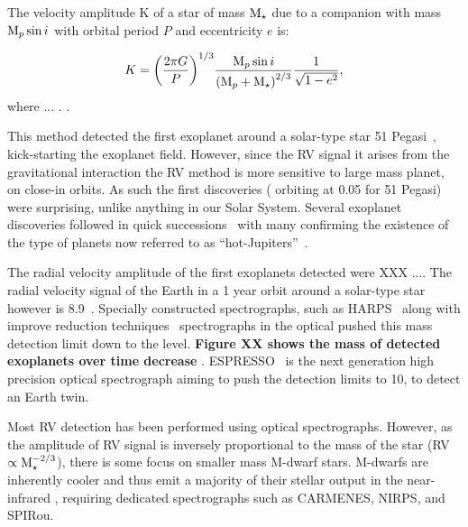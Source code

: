 The velocity amplitude K of a star of mass $\textrm{M}_{\star}$ due to a companion with mass $\textrm{M}_{p}\sin{i}$ with orbital period $P$ and eccentricity $e$ is:

\begin{equation}
K = {\left(\frac{2\pi G}{P}\right)}^{1/3} \frac{\textrm{M}_{p} \sin{i}}{{(\textrm{M}_{p} + \textrm{M}_{\star})}^{2/3}} \frac{1}{\sqrt{1-{e}^{2}}},
\end{equation}
where ... . \citet[e.g.][]{cumming_lick_1999}.


This method detected the first exoplanet around a solar-type star {51 Pegasi}~\citep{mayor_jupitermass_1995}, kick-starting the exoplanet field.
However, since the {RV} signal it arises from the gravitational interaction the {RV} method is more sensitive to large mass planet, on close-in orbits.
As such the first discoveries (\Mjup{} orbiting at 0.05\AU{} for {51 Pegasi}) were surprising, unlike anything in our Solar System.
Several exoplanet discoveries followed in quick successions~\citep[e.g.][]{butler_planet_1996, marcy_planetary_1996} with many confirming the existence of the type of planets now referred to as ``hot-Jupiters''~\citep{butler_three_1997, charbonneau_detection_2000}.

The radial velocity amplitude of the first exoplanets detected were XXX \kmps....
The radial velocity signal of the Earth in a 1 year orbit around a solar-type star however is 8.9\cmps{}~\citep{figueira_radial_2010}.
Specially constructed spectrographs, such as HARPS~\citep{mayor_setting_2003} along with improve reduction techniques~\citet{lovis_new_2007} spectrographs in the optical pushed this mass detection limit down to the \mps{} level. \textbf{ Figure XX shows the mass of detected exoplanets over time decrease} .
ESPRESSO~\citep{pepe_espresso_2014, megevand_espresso_2014} is the next generation high precision optical spectrograph aiming to push the detection limits to 10\cmps, to detect an Earth twin.

Most {RV} detection has been performed using optical spectrographs.
However, as the amplitude of {RV} signal is inversely proportional to the mass of the star (RV $\propto \textrm{M}_{\star}^{-2/3}$), there is some focus on smaller mass M-dwarf stars.
M-dwarfs are inherently cooler and thus emit a majority of their stellar output in the near-infrared , requiring dedicated \nir{} spectrographs such as {CARMENES}, {NIRPS}, and {SPIRou}.

